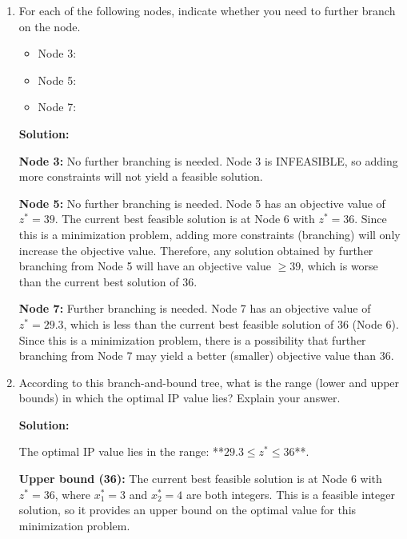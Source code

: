 \documentclass{article}
\begin{document}
\begin{enumerate}
\begin{enumerate}
This is a **minimization problem**.

The reason is that as we add more constraints (branching), the objective function value increases. The most relaxed problem (Node 1) has the smallest objective value $z^* = 28.9$, and as we add constraints and branch further, the values increase: $29.5$ (Node 2), $30.1$ (Node 4), $36$ (Node 6), and $39$ (Node 5). This pattern indicates that we are minimizing: tighter constraints (more restrictions) lead to worse (larger) objective values, which is characteristic of a minimization problem.

\item  For each of the following nodes, indicate whether you need to further branch on the node.
\begin{itemize}
    \item[] Node 3:
    \item[] Node 5:
    \item[] Node 7:
\end{itemize}

\textbf{Solution:}

\textbf{Node 3:} No further branching is needed. Node 3 is INFEASIBLE, so adding more constraints will not yield a feasible solution.

\textbf{Node 5:} No further branching is needed. Node 5 has an objective value of $z^* = 39$. The current best feasible solution is at Node 6 with $z^* = 36$. Since this is a minimization problem, adding more constraints (branching) will only increase the objective value. Therefore, any solution obtained by further branching from Node 5 will have an objective value $\geq 39$, which is worse than the current best solution of $36$.

\textbf{Node 7:} Further branching is needed. Node 7 has an objective value of $z^* = 29.3$, which is less than the current best feasible solution of $36$ (Node 6). Since this is a minimization problem, there is a possibility that further branching from Node 7 may yield a better (smaller) objective value than $36$.

\item According to this branch-and-bound tree, what is the range (lower and upper bounds) in which the optimal IP value lies? Explain your answer.

\textbf{Solution:}

The optimal IP value lies in the range: **$29.3 \leq z^* \leq 36$**.

\textbf{Upper bound (36):} The current best feasible solution is at Node 6 with $z^* = 36$, where $x_1^* = 3$ and $x_2^* = 4$ are both integers. This is a feasible integer solution, so it provides an upper bound on the optimal value for this minimization problem.


\end{enumerate}
\end{enumerate}
\end{document}
